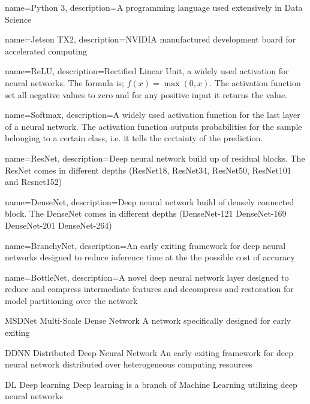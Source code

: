 {
	name=Python 3,
	description={A programming language used extensively in Data Science}
}

{
	name=Jetson TX2,
	description={NVIDIA manufactured development board for accelerated computing}
}


{
	name=ReLU,
	description={Rectified Linear Unit, a widely used activation for neural networks. The formula is; $f(x)=\max(0,x)$. The activation function set all negative values to zero and for any positive input it returns the value.}
}

{
	name=Softmax,
	description={A widely used activation function for the last layer of a neural network. The activation function outputs probabilities for the sample belonging to a certain class, i.e. it tells the certainty of the prediction.}
}

{
	name={ResNet},
	description={Deep neural network build up of residual blocks. The ResNet comes in different depths (ResNet18, ResNet34, ResNet50, ResNet101 and Resnet152)}
}

{
	name={DenseNet},
	description={Deep neural network build of densely connected block. The DenseNet comes in different depths (DenseNet-121 DenseNet-169 DenseNet-201 DenseNet-264)}
}


{
	name={BranchyNet},
	description={An early exiting framework for deep neural networks designed to reduce inference time at the the possible cost of accuracy}
}

{
	name={BottleNet},
	description={A novel deep neural network layer designed to reduce and compress intermediate features and decompress and restoration for model partitioning over the network}
}

	{MSDNet}
	{Multi-Scale Dense Network}
	{A network specifically designed for early exiting}
	
	
	{DDNN}
	{Distributed Deep Neural Network}
	{An early exiting framework for deep neural network distributed over heterogeneous computing resources}
	
	{DL}
	{Deep learning}
	{Deep learning is a branch of Machine Learning utilizing deep neural networks}



